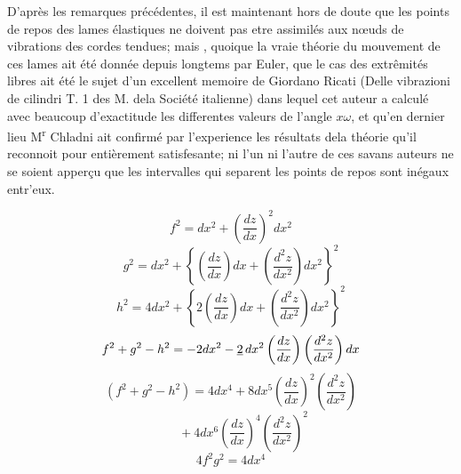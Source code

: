 \documentclass[11pt,a4paper]{article}
\begin{document}
D'après les remarques précédentes, il est maintenant
hors de doute que les points de repos des lames
élastiques ne doivent pas etre assimilés aux nœuds
de vibrations des cordes tendues; mais , quoique la vraie théorie du mouvement de
ces lames ait été donnée depuis longtems par
Euler, que le cas des extrêmités libres ait été
le sujet d'un excellent memoire de Giordano
Ricati (Delle vibrazioni de cilindri T. 1 des M. dela
Société italienne) dans lequel cet auteur a calculé
avec beaucoup d'exactitude les differentes valeurs
de l'angle $x\omega$, et qu'en dernier lieu M\textsuperscript{r}
Chladni ait confirmé par l'experience les
résultats dela théorie qu'il reconnoit pour
entièrement satisfesante;  ni l'un ni l'autre
de ces savans auteurs ne se soient apperçu
que les intervalles qui separent les points
de repos sont inégaux entr'eux. 


\[ f^2 = dx^2 + \left(\frac{dz}{dx}\right)^2 dx^2 \]
\[ g^2 = dx^2 + \left\{\left(\frac{dz}{dx}\right)dx + \left(\frac{d^2z}{dx^2}\right)dx^2\right\}^2 \]
\[ h^2 = 4dx^2 + \left\{2\left(\frac{dz}{dx}\right)dx + \left(\frac{d^2z}{dx^2}\right)dx^2\right\}^2 \]
\[ f^2 + g^2 - h^2 = -2dx^2 - \uncertain{2}\,dx^2\left(\frac{dz}{dx}\right)\left(\frac{d^2z}{dx^2}\right)dx \]
\[ (f^2 + g^2 - h^2) = 4dx^4 + 8dx^5\left(\frac{dz}{dx}\right)^2\left(\frac{d^2z}{dx^2}\right) \]
\[ \qquad + 4dx^6\left(\frac{dz}{dx}\right)^4\left(\frac{d^2z}{dx^2}\right)^2 \]
\[ 4f^2g^2 = 4dx^4 \]
\end{document}
